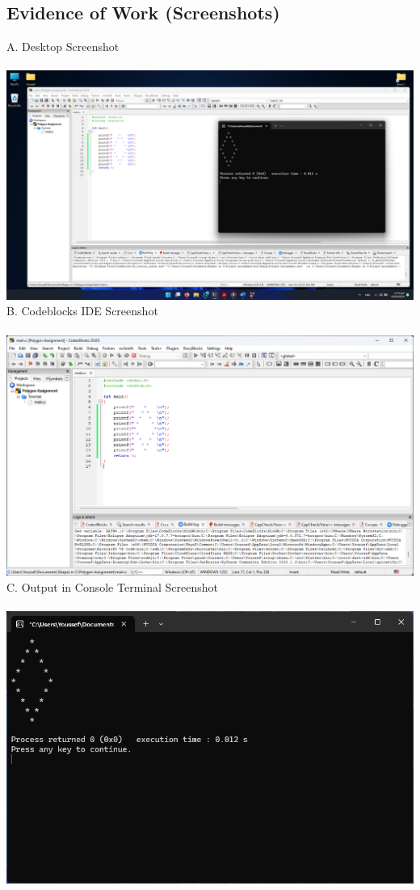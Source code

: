 \documentclass[a4paper,11pt]{article}
\theoremstyle{mytheor}
\begin{document}
\subsection{Evidence of Work (Screenshots)}
A. Desktop Screenshot\\\\
\includegraphics[width=1.1\linewidth, center]{desktop.png}
\newpage
B. Codeblocks IDE Screenshot\\\\
\includegraphics[width=1.1\linewidth, center]{codeblocks.png}
C. Output in Console Terminal Screenshot\\\\
\includegraphics[width=1.1\linewidth, center]{terminal.png}
\end{document}
